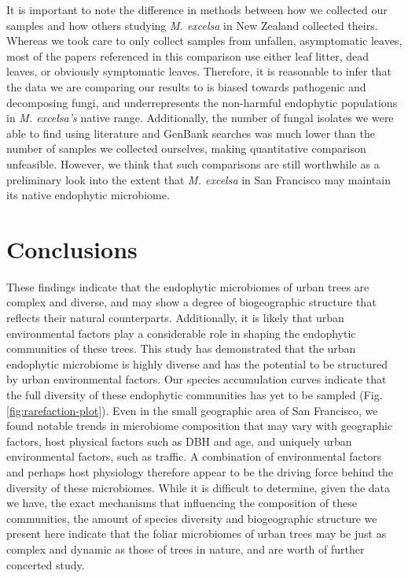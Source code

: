\documentclass[fleqn,10pt,lineno]{wlpeerj} %
\begin{document}
It is important to note the difference in methods between how we collected our samples and how others studying \emph{M. excelsa} in New Zealand collected theirs. Whereas we took care to only collect samples from unfallen, asymptomatic leaves, most of the papers referenced in this comparison use either leaf litter, dead leaves, or obviously symptomatic leaves. Therefore, it is reasonable to infer that the data we are comparing our results to is biased towards pathogenic and decomposing fungi, and underrepresents the non-harmful endophytic populations in \emph{M. excelsa's} native range. Additionally, the number of fungal isolates we were able to find using literature and GenBank searches was much lower than the number of samples we collected ourselves, making quantitative comparison unfeasible. However, we think that such comparisons are still worthwhile as a preliminary look into the extent that \emph{M. excelsa} in San Francisco may maintain its native endophytic microbiome.

\hypertarget{conclusions}{%
\section*{Conclusions}\label{conclusions}}

These findings indicate that the endophytic microbiomes of urban trees are complex and diverse, and may show a degree of biogeographic structure that reflects their natural counterparts. Additionally, it is likely that urban environmental factors play a considerable role in shaping the endophytic communities of these trees. This study has demonstrated that the urban endophytic microbiome is highly diverse and has the potential to be structured by urban environmental factors. Our species accumulation curves indicate that the full diversity of these endophytic communities has yet to be sampled (Fig. \ref{fig:rarefaction-plot}). Even in the small geographic area of San Francisco, we found notable trends in microbiome composition that may vary with geographic factors, host physical factors such as DBH and age, and uniquely urban environmental factors, such as traffic. A combination of environmental factors and perhaps host physiology therefore appear to be the driving force behind the diversity of these microbiomes. While it is difficult to determine, given the data we have, the exact mechanisms that influencing the composition of these communities, the amount of species diversity and biogeographic structure we present here indicate that the foliar microbiomes of urban trees may be just as complex and dynamic as those of trees in nature, and are worth of further concerted study.
\end{document}
